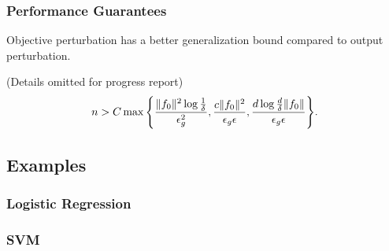 \documentclass{article} %
\begin{document}
\subsubsection{Performance Guarantees}
Objective perturbation has a better generalization bound compared to output perturbation.
\begin{theorem} (Details omitted for progress report)
$$n > C\max{\left\{ \frac{\lVert f_0\rVert^2 \log{\frac{1}{\delta}}}{\epsilon_g^2}, \frac{c\lVert f_0\rVert^2}{\epsilon_g \epsilon}, \frac{d\log{\frac{d}{\delta}} \lVert f_0\rVert}{\epsilon_g\epsilon}\right\}}.$$
\end{theorem}
\subsection{Examples}
	\subsubsection{Logistic Regression}
	\subsubsection{SVM}

{\small


}
\end{document}
